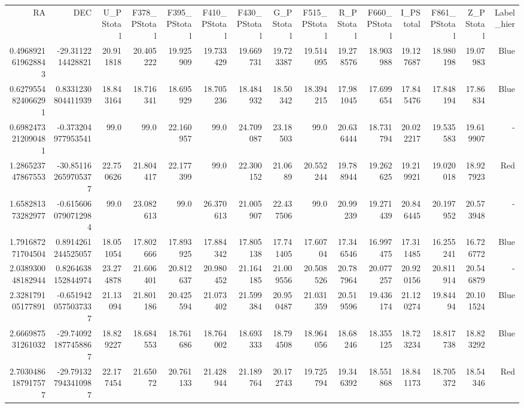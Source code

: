 \begin{center}
\begin{longtable}{rrrrrrrrrrrrrrr}
RA & DEC & U_PStotal & F378_PStotal & F395_PStotal & F410_PStotal & F430_PStotal & G_PStotal & F515_PStotal & R_PStotal & F660_PStotal & I_PStotal & F861_PStotal & Z_PStotal & Label_hier \\
0.4968921619628843 & -29.3112214428821 & 20.911818 & 20.405222 & 19.925909 & 19.733429 & 19.669731 & 19.723387 & 19.514095 & 19.278576 & 18.903988 & 19.127687 & 18.980198 & 19.07983 & Blue \\
0.6279554824066291 & 0.8331230804411939 & 18.843164 & 18.716341 & 18.695929 & 18.705236 & 18.484932 & 18.50342 & 18.394215 & 17.981045 & 17.699654 & 17.845476 & 17.848194 & 17.86834 & Blue \\
0.6982473212090481 & -0.373204977953541 & 99.0 & 99.0 & 22.160957 & 99.0 & 24.709087 & 23.18503 & 99.0 & 20.636444 & 18.731794 & 20.022217 & 19.535583 & 19.619907 & - \\
1.286523747867553 & -30.851162659705377 & 22.750626 & 21.804417 & 22.177399 & 99.0 & 22.300152 & 21.0689 & 20.552244 & 19.788944 & 19.262625 & 19.219921 & 19.020018 & 18.927923 & Red \\
1.658281373282977 & -0.6156060790712984 & 99.0 & 23.082613 & 99.0 & 26.370613 & 21.005907 & 22.437506 & 99.0 & 20.99239 & 19.271439 & 20.846445 & 20.197952 & 20.573948 & - \\
1.791687271704504 & 0.8914261244525057 & 18.051054 & 17.802666 & 17.893925 & 17.884342 & 17.805138 & 17.741405 & 17.60704 & 17.346546 & 16.997475 & 17.311485 & 16.255241 & 16.726772 & Blue \\
2.038930048182944 & 0.8264638152844974 & 23.274878 & 21.606401 & 20.812637 & 20.980452 & 21.164185 & 21.009556 & 20.508526 & 20.787964 & 20.077257 & 20.920156 & 20.811914 & 20.546879 & - \\
2.328179105177891 & -0.6519420575037337 & 21.13094 & 21.801186 & 20.425594 & 21.073402 & 21.599384 & 20.950487 & 21.031359 & 20.519596 & 19.436174 & 21.120274 & 19.84494 & 20.101524 & Blue \\
2.666987531261032 & -29.740921877458867 & 18.829227 & 18.684553 & 18.761686 & 18.764002 & 18.693333 & 18.794508 & 18.964056 & 18.68246 & 18.355125 & 18.723234 & 18.817738 & 18.823292 & Blue \\
2.7030486187917577 & -29.791327943410987 & 22.177454 & 21.65072 & 20.761133 & 21.428944 & 21.189764 & 20.172743 & 19.725794 & 19.346392 & 18.551868 & 18.841173 & 18.705372 & 18.54346 & Red \\

\end{longtable}
\end{center}
